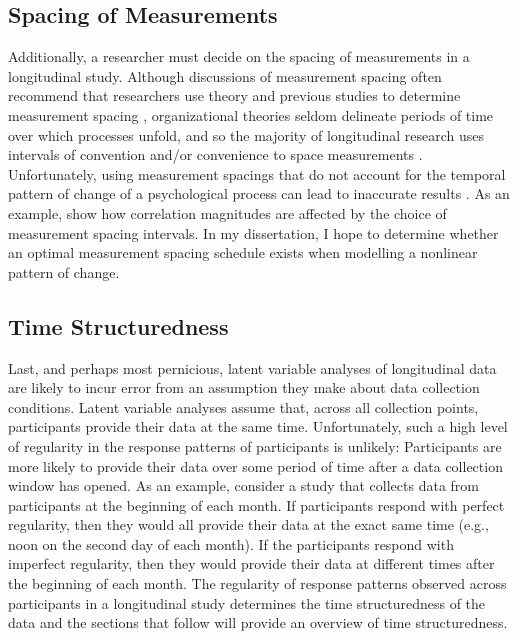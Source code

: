 \documentclass[
12pt, %
twoside,
english]{guelphthesis}
\begin{document}
\hypertarget{spacing-of-measurements}{%
\subsection{Spacing of Measurements}\label{spacing-of-measurements}}

Additionally, a researcher must decide on the spacing of measurements in a longitudinal study. Although discussions of measurement spacing often recommend that researchers use theory and previous studies to determine measurement spacing \autocite{mitchell2001,cole2003,collins2006,dormann2014,dormann2015}, organizational theories seldom delineate periods of time over which processes unfold, and so the majority of longitudinal research uses intervals of convention and/or convenience to space measurements \autocite{mitchell2001,dormann2014}. Unfortunately, using measurement spacings that do not account for the temporal pattern of change of a psychological process can lead to inaccurate results \autocite[e.g.,][]{chen2014}. As an example, \textcite{cole2009} show how correlation magnitudes are affected by the choice of measurement spacing intervals. In my dissertation, I hope to determine whether an optimal measurement spacing schedule exists when modelling a nonlinear pattern of change.

\hypertarget{time-structuredness}{%
\subsection{Time Structuredness}\label{time-structuredness}}

Last, and perhaps most pernicious, latent variable analyses of longitudinal data are likely to incur error from an assumption they make about data collection conditions. Latent variable analyses assume that, across all collection points, participants provide their data at the same time. Unfortunately, such a high level of regularity in the response patterns of participants is unlikely: Participants are more likely to provide their data over some period of time after a data collection window has opened. As an example, consider a study that collects data from participants at the beginning of each month. If participants respond with perfect regularity, then they would all provide their data at the exact same time (e.g., noon on the second day of each month). If the participants respond with imperfect regularity, then they would provide their data at different times after the beginning of each month. The regularity of response patterns observed across participants in a longitudinal study determines the time structuredness of the data and the sections that follow will provide an overview of time structuredness.
\end{document}
